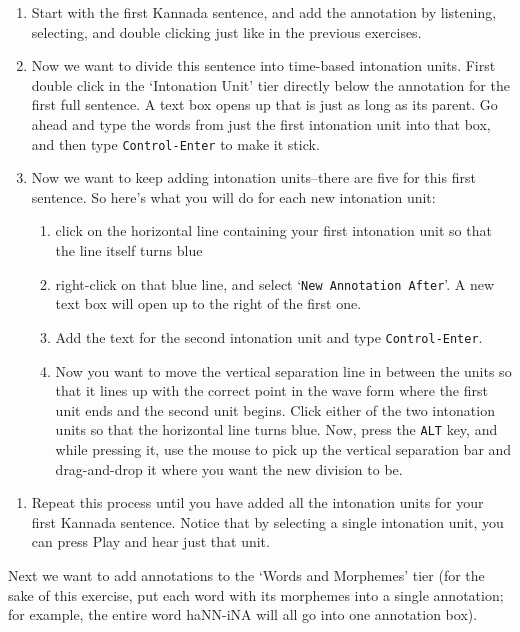 \documentclass[letterpaper,12pt]{article}
\begin{document}
\begin{enumerate}
\item Start with the first Kannada sentence, and add the annotation by listening, selecting,
and double clicking just like in the previous exercises.
\item Now we want to divide this sentence into time-based intonation units. First double click in the `Intonation Unit' tier directly below the annotation for the first full sentence. A text box opens up that is just as long as its parent. Go ahead and type the words from just the first intonation unit into that box, and then type \texttt{Control-Enter} to make it stick.
\item Now we want to keep adding intonation units--there are five for this first sentence. So here's what you will do for each new intonation unit:
\begin{enumerate}
\item click on the horizontal line containing your first intonation unit so that the line itself turns blue
\item right-click on that blue line, and select `\texttt{New Annotation After}'. A new text box will open up to the right of the first one.
\item Add the text for the second intonation unit and type \texttt{Control-Enter}.
\item Now you want to move the vertical separation line in between the units so that it lines up with the correct point in the wave form where the first unit ends and the second unit begins. Click either of the two intonation units so that the horizontal line turns blue. Now, press the \texttt{ALT} key, and while pressing it, use the mouse to pick up the vertical separation bar and drag-and-drop it where you want the new division to be.
\end{enumerate}
\end{enumerate}

\begin{enumerate}
\item Repeat this process until you have added all the intonation units for your first Kannada sentence. Notice that by selecting a single intonation unit, you can press Play and hear just that unit.
\end{enumerate}

\noindent Next we want to add annotations to the `Words and Morphemes' tier (for the sake of this exercise, put each word with its morphemes into a single annotation; for example, the entire word haNN-iNA will all go into one annotation box).
\end{document}
